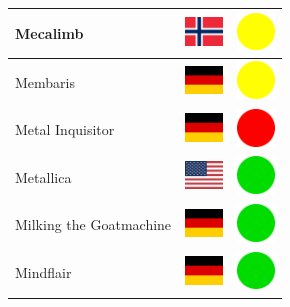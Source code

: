 \documentclass[12pt, a4paper, twoside]{report}
\begin{document}
\begin{center}
\begin{longtable}{|p{5cm}|p{2cm}|p{2cm}|}
			Mecalimb & \includegraphics[width=1cm]{4x3/no} & \includegraphics[width=1cm]{likes/m} \\ \hline
			Membaris & \includegraphics[width=1cm]{4x3/de} & \includegraphics[width=1cm]{likes/m} \\ \hline
			Metal Inquisitor & \includegraphics[width=1cm]{4x3/de} & \includegraphics[width=1cm]{likes/n} \\ \hline
			Metallica & \includegraphics[width=1cm]{4x3/us} & \includegraphics[width=1cm]{likes/y} \\ \hline
			Milking the Goatmachine & \includegraphics[width=1cm]{4x3/de} & \includegraphics[width=1cm]{likes/y} \\ \hline
			Mindflair & \includegraphics[width=1cm]{4x3/de} & \includegraphics[width=1cm]{likes/y} \\ \hline

\end{longtable}
\end{center}
\end{document}
